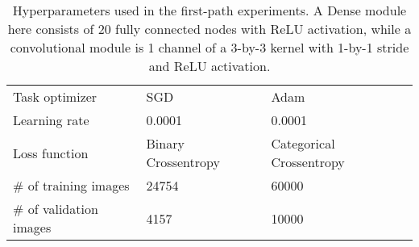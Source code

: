 \begin{table}[ht]
\begin{tabular}{lll}
Task optimizer         & SGD                                                                                          & Adam                                                                                                                                                              \\
Learning rate          & 0.0001                                                                                       & 0.0001                                                                                                                                                            \\
Loss function          & Binary Crossentropy                                                                          & Categorical Crossentropy                                                                                                                                          \\
\# of training images   & 24754                                                                                        & 60000                                                                                                                                          \\
\# of validation images & 4157                                                                                         & 10000    

\end{tabular}
\caption{Hyperparameters used in the first-path experiments. A Dense module here consists of 20 fully connected nodes with ReLU activation, while a convolutional module is 1 channel of a 3-by-3 kernel with 1-by-1 stride and ReLU activation.}
\label{tab:exp1.hyperparam}
\end{table}